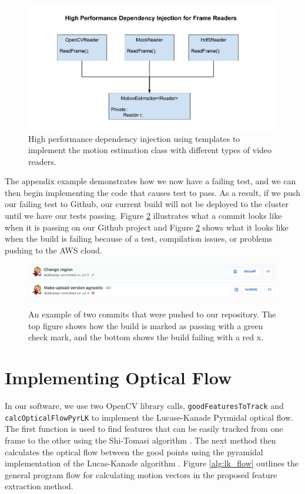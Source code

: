 \begin{figure}[h]
  \label{fig:hiperf_dependency}
  \centering
  \includegraphics[width=\textwidth]{figures/dependency_injection}
  \caption{High performance dependency injection using templates to implement the
  motion estimation class with different types of video readers.}
\end{figure}

The appendix example demonstrates how we now have a failing test, and we can then
begin implementing the code that causes test to pass. As a result, if we
push our failing test to Github, our current build will not be deployed to the cluster
until we have our tests passing. Figure \ref{fig:passing} illustrates what a commit
looks like when it is passing on our Github project and Figure \ref{fig:passing}
shows what it looks like when the build is failing because of a test, compilation
issues, or problems pushing to the AWS cloud.

\begin{figure}[h]
  \label{fig:passing}
  \centering
  \includegraphics[width=\textwidth]{figures/passing}
  \includegraphics[width=\textwidth]{figures/failing}
  \caption{An example of two commits that were pushed to our repository. The
  top figure shows how the build is marked as passing with a green check mark,
  and the bottom shows the build failing with a red x.}
\end{figure}


\section{\label{section:vida_oflow} Implementing Optical Flow }
In our software, we use two OpenCV library calls, \texttt{goodFeaturesToTrack}
and \\
\texttt{calcOpticalFlowPyrLK} to implement the Lucase-Kanade Pyrmidal optical
flow. The first function is used to find features that can be easily tracked
from one frame to the other using the Shi-Tomasi algorithm \cite{shi1994good}.
The next method then calculates the optical flow between the good points using
the pyramidal implementation of the Lucas-Kanade algorithm
\cite{bouguet2001pyramidal}. Figure \ref{alg:lk_flow} outlines the general
program flow for calculating motion vectors in the proposed feature extraction method.

